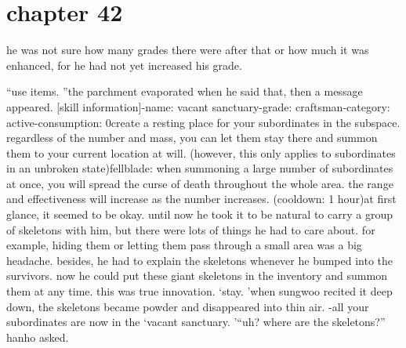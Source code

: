 \section{chapter 42}

                            he was not sure how many grades there were after that or how much it was enhanced, for he had not yet increased his grade.





“use items.
”the parchment evaporated when he said that, then a message appeared.
[skill information]-name: vacant sanctuary-grade: craftsman-category: active-consumption: 0create a resting place for your subordinates in the subspace.
 regardless of the number and mass, you can let them stay there and summon them to your current location at will.
 (however, this only applies to subordinates in an unbroken state)fellblade: when summoning a large number of subordinates at once, you will spread the curse of death throughout the whole area.
 the range and effectiveness will increase as the number increases.
 (cooldown: 1 hour)at first glance, it seemed to be okay.
 until now he took it to be natural to carry a group of skeletons with him, but there were lots of things he had to care about.
 for example, hiding them or letting them pass through a small area was a big headache.
 besides, he had to explain the skeletons whenever he bumped into the survivors.
now he could put these giant skeletons in the inventory and summon them at any time.
 this was true innovation.
‘stay.
’when sungwoo recited it deep down, the skeletons became powder and disappeared into thin air.
-all your subordinates are now in the ‘vacant sanctuary.
’“uh? where are the skeletons?” hanho asked.

